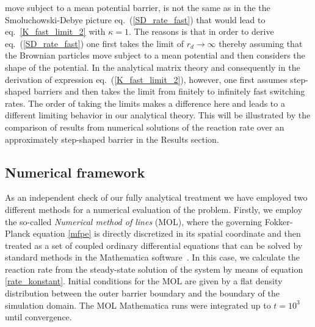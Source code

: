 \documentclass[preprint,superscriptaddress]{revtex4-1}
\begin{document}
move subject to a mean potential barrier, is not the same as in the the Smoluchowski-Debye picture eq.~(\ref{SD_rate_fast}) that  
would lead to eq.~\eqref{K_fast_limit_2} with $\kappa = 1$.  The reasons is that in order to derive eq.~(\ref{SD_rate_fast}) one first 
takes the limit of $r_d \rightarrow \infty$ thereby assuming that the Brownian particles move subject to a mean potential 
and then considers the shape of the potential. In the analytical matrix theory and consequently in the derivation of expression eq.~(\ref{K_fast_limit_2}), however, one first assumes step-shaped barriers and then takes the limit from finitely to infinitely fast switching rates. 
The order of taking the limits makes a difference here and leads to a different limiting behavior in our analytical theory. 
This will be illustrated by the comparison of results from numerical solutions of the reaction rate 
over an approximately step-shaped barrier in the Results section. 

\subsection{Numerical framework}

As an independent check of our fully analytical treatment we have employed two different methods for a numerical evaluation of the problem. 
Firstly, we employ the so-called \emph{Numerical method of lines} (MOL), where the governing Fokker-Planck equation \eqref{mfpe} is directly discretized in its spatial coordinate and then treated as a set of coupled ordinary differential equations that can be solved by standard methods in the Mathematica software~\cite{mathematica}. In this case, we calculate the reaction rate from the steady-state solution of the system by means of equation \eqref{rate_konstant}. 
Initial conditions for the MOL  are given by a flat density distribution between the outer barrier boundary and the boundary of the simulation domain. 
The MOL Mathematica runs were integrated up to $t = 10^{3}$ until convergence.
\end{document}
